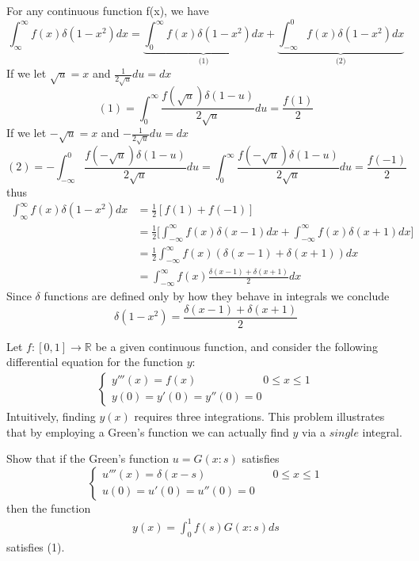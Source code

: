 \documentclass[12pt]{article}
\newcommand{\R}{\mathbb{R}}
\newenvironment{problem}[2][Problem]{\begin{trivlist}
  \item[\hskip \labelsep {\bfseries #1}\hskip \labelsep {\bfseries #2:}]}{\end{trivlist}}
\newenvironment{subproblem}[2][Part]{\begin{trivlist}
  \item[\hskip \labelsep {\bfseries #1}\hskip \labelsep {\bfseries (#2)}]}{\end{trivlist}}
\newenvironment{solution}[1][Solution]{\begin{trivlist}
  \item[\hskip \labelsep {\bfseries #1} \hskip \labelsep]}{\end{trivlist}}
\theoremstyle{remark}
\begin{document}
\begin{solution}
  For any continuous function f(x), we have
  \[
    \int_{\infty}^{\infty}f(x)\delta(1-x^2)dx =
    \underbrace{\int_{0}^{\infty}f(x)\delta(1-x^2)dx}_\text{(1)} +
    \underbrace{\int_{-\infty}^{0}f(x)\delta(1-x^2)dx}_\text{(2)}
  \]
  If we let \(\sqrt{u} = x\) and \(\frac{1}{2\sqrt{u}}du = dx\)
  \[
    (1) = \int_{0}^{\infty}\frac{f(\sqrt{u})\delta(1-u)}{2\sqrt{u}}du = \frac{f(1)}{2}
  \]
  If we let \(-\sqrt{u} = x\) and \(-\frac{1}{2\sqrt{u}}du = dx\)
  \[
    (2) = -\int_{-\infty}^{0}\frac{f(-\sqrt{u})\delta(1-u)}{2\sqrt{u}}du
    = \int_{0}^{\infty}\frac{f(-\sqrt{u})\delta(1-u)}{2\sqrt{u}}du
    = \frac{f(-1)}{2}
  \]
  thus
  \begin{align*}
    \int_{\infty}^{\infty}f(x)\delta(1-x^2)dx
    &= \frac{1}{2}[f(1) + f(-1)] \\
    &= \frac{1}{2}\bigg[\int_{-\infty}^{\infty}f(x)\delta(x-1)dx +
      \int_{-\infty}^{\infty}f(x)\delta(x+1)dx\bigg] \\
    &= \frac{1}{2}\int_{-\infty}^{\infty}f(x)(\delta(x-1) + \delta(x+1)) dx \\
    &= \int_{-\infty}^{\infty}f(x)\frac{\delta(x-1) + \delta(x+1)}{2} dx
  \end{align*}
  Since \(\delta\) functions are defined only by how they behave in integrals we conclude
  \[
    \boxed{\delta(1-x^2) = \frac{\delta(x-1)+\delta(x+1)}{2}}
  \]
\end{solution}
\clearpage
\begin{problem}{3}
  Let \(f : [0,1] \rightarrow \R\) be a given continuous function,
  and consider the following differential equation for the function \(y\):
  \begin{align}
    \left\{
      \begin{array}{ll}
        y'''(x) = f(x) \qquad\qquad\qquad 0 \le x \le 1 \\
        y(0) = y'(0) = y''(0) = 0
      \end{array}
    \right.
  \end{align}
  Intuitively, finding \(y(x)\) requires three integrations. This problem illustrates that
  by employing a Green's function we can actually find \(y\) via a $single$ integral.
\end{problem}
\begin{subproblem}{a}
  Show that if the Green's function \(u = G(x:s)\) satisfies
  \[
    \left\{
      \begin{array}{ll}
        u'''(x) = \delta(x-s) \qquad\qquad\qquad 0 \le x \le 1 \\
        u(0) = u'(0) = u''(0) = 0
      \end{array}
    \right.
  \]
  then the function
  \begin{align}
    y(x) = \int_{0}^{1}f(s)G(x:s)ds
  \end{align}
  satisfies (1).
  
  
\end{subproblem}
\end{document}
